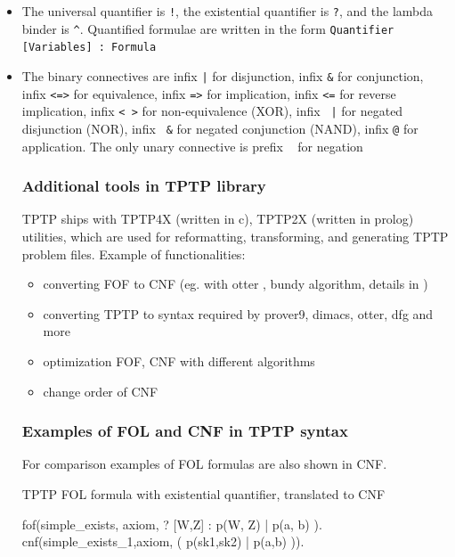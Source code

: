 \begin{itemize}
  \item The universal quantifier is \texttt{!}, the existential quantifier is \texttt{?}, and the lambda binder is \texttt{^}. Quantified formulae are written in the form \texttt{Quantifier [Variables] :  Formula}

  \item The binary connectives are infix \texttt{|} for disjunction, infix \texttt{&} for conjunction, infix \texttt{<=>} for equivalence, infix \texttt{=>} for implication, infix \texttt{<=} for reverse implication, infix \texttt{<~>} for non-equivalence (XOR), infix \texttt{~|} for negated disjunction (NOR), infix	\texttt{~&} for negated conjunction (NAND), infix \texttt{@} for application. The only unary connective is prefix \texttt{~} for negation

\subsubsection{Additional tools in TPTP library}
\label{sub:AdditionalToolsInTPTPLibrary}

TPTP ships with \gls{TPTP4X} (written in c), \gls{TPTP2X} (written in prolog) utilities, which are used for reformatting, transforming, and generating TPTP problem files. Example of functionalities:

\begin{itemize}
  \item converting \gls{FOF} to \gls{CNF} (eg. with otter \cite{McC-Otter-URL}, bundy \cite{Bun83} algorithm, details in \cite{SM96})
  \item converting TPTP to syntax required by prover9, dimacs, otter, dfg and more
  \item optimization \gls{FOF}, \gls{CNF} with different algorithms
  \item change order of \gls{CNF}
\end{itemize}

\subsubsection{Examples of FOL and CNF in TPTP syntax}

For comparison examples of \gls{FOL} formulas are also shown in CNF. 

\begin{listing}[H]
  \caption{TPTP FOL formula with existential quantifier, translated to CNF}
\begin{tptpcode}
fof(simple_exists, axiom,
 ? [W,Z] : p(W, Z) | p(a, b)
  ).
cnf(simple_exists_1,axiom,
    ( p(sk1,sk2) | p(a,b) )).
\end{tptpcode}
\end{listing}


\end{itemize}
